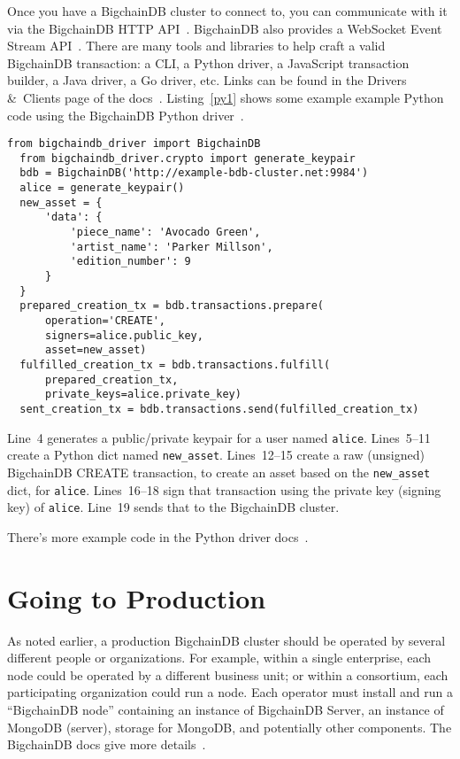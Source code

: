 \documentclass[a4paper]{article}
\begin{document}
Once you have a BigchainDB cluster to connect to,
you can communicate with it via the BigchainDB HTTP API~\cite{bigchaindb_http_api}.
BigchainDB also provides a WebSocket Event Stream API~\cite{bigchaindb_websocket_api}.
There are many tools and libraries to help craft a valid BigchainDB transaction:
a CLI, a Python driver, a JavaScript transaction builder, a Java driver, a Go driver, etc.
Links can be found in the Drivers \&~Clients page
of the docs~\cite{bigchaindb_drivers_clients}.
Listing~\ref{py1} shows some example example Python code
using the BigchainDB Python driver~\cite{bigchaindb_python_driver}.


\begin{minipage}{\linewidth}
  \begin{lstlisting}[caption={Example Code Using the Python Driver}, label={py1}, style=python]
  from bigchaindb_driver import BigchainDB
  from bigchaindb_driver.crypto import generate_keypair
  bdb = BigchainDB('http://example-bdb-cluster.net:9984')
  alice = generate_keypair()
  new_asset = {
      'data': {
          'piece_name': 'Avocado Green',
          'artist_name': 'Parker Millson',
          'edition_number': 9
      }
  }
  prepared_creation_tx = bdb.transactions.prepare(
      operation='CREATE',
      signers=alice.public_key,
      asset=new_asset)
  fulfilled_creation_tx = bdb.transactions.fulfill(
      prepared_creation_tx,
      private_keys=alice.private_key)
  sent_creation_tx = bdb.transactions.send(fulfilled_creation_tx)\end{lstlisting}
\end{minipage}

\medskip

Line~4 generates a public/private keypair for a user named \texttt{alice}.
Lines~5--11 create a Python dict named \texttt{new\_asset}.
Lines~12--15 create a raw (unsigned) BigchainDB CREATE transaction,
to create an asset based on the \texttt{new\_asset} dict, for \texttt{alice}.
Lines~16--18 sign that transaction using the private key (signing key)
of \texttt{alice}. Line~19 sends that to the BigchainDB cluster.

There's more example code
in the Python driver docs~\cite{bigchaindb_python_driver}.


\section{Going to Production}

As noted earlier, a production BigchainDB cluster should be operated
by several different people or organizations.
For example, within a single enterprise,
each node could be operated by a different business unit;
or within a consortium, each participating organization could run a node.
Each operator must install and run a ``BigchainDB node''
containing an instance of BigchainDB Server,
an instance of MongoDB (server),
storage for MongoDB,
and potentially other components.
The BigchainDB docs give more details~\cite{bigchaindb_prod_nodes}.
\end{document}
